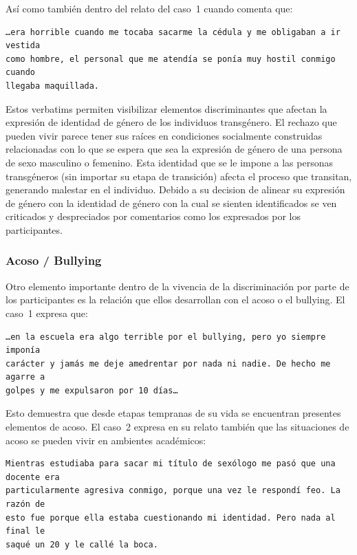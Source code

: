 Así como también dentro del relato del caso~1 cuando comenta que:

\begin{verbatim}
…era horrible cuando me tocaba sacarme la cédula y me obligaban a ir vestida
como hombre, el personal que me atendía se ponía muy hostil conmigo cuando
llegaba maquillada.
\end{verbatim}

Estos verbatims permiten visibilizar elementos discriminantes que afectan la
expresión de identidad de género de los individuos transgénero. El rechazo que
pueden vivir parece tener sus raíces en condiciones socialmente construidas
relacionadas con lo que se espera que sea la expresión de género de una persona
de sexo masculino o femenino. Esta identidad que se le impone a las personas
transgéneros (sin importar su etapa de transición) afecta el proceso
que transitan, generando malestar en el individuo. Debido a su decision de
alinear su expresión de género con la identidad de género con la cual se sienten
identificados se ven criticados y despreciados por comentarios como los
expresados por los participantes.

\subsubsection{Acoso / Bullying}

Otro elemento importante dentro de la vivencia de la discriminación por parte de
los participantes es la relación que ellos desarrollan con el acoso o el bullying.
El caso~1 expresa que:

\begin{verbatim}
…en la escuela era algo terrible por el bullying, pero yo siempre imponía
carácter y jamás me deje amedrentar por nada ni nadie. De hecho me agarre a
golpes y me expulsaron por 10 días…
\end{verbatim}

Esto demuestra que desde etapas tempranas de su vida se encuentran presentes
elementos de acoso. El caso~2 expresa en su relato también que las situaciones
de acoso se pueden vivir en ambientes académicos:

\begin{verbatim}
Mientras estudiaba para sacar mi título de sexólogo me pasó que una docente era
particularmente agresiva conmigo, porque una vez le respondí feo. La razón de
esto fue porque ella estaba cuestionando mi identidad. Pero nada al final le
saqué un 20 y le callé la boca.
\end{verbatim}

